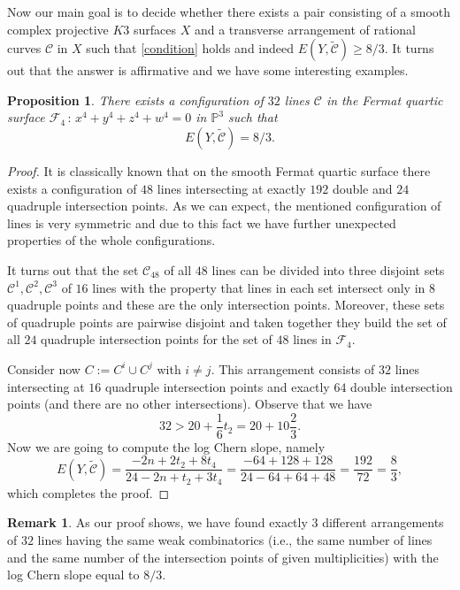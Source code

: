 \documentclass{article}
\theoremstyle{plain}
\newtheorem{proposition}[thm]{Proposition}
\theoremstyle{definition}
\newtheorem{remark}[thm]{Remark}
\numberwithin{equation}{section}
\begin{document}
Now our main goal is to decide whether there exists a pair consisting of a smooth complex projective $K3$ surfaces $X$ and a transverse arrangement of rational curves $\mathcal{C}$ in $X$ such that \eqref{condition} holds and indeed $E(Y, \widetilde{\mathcal{C}}) \geq 8/3$. It turns out that the answer is affirmative and we have some interesting examples.
\begin{proposition}
\label{maint}
There exists a configuration of $32$ lines $\mathcal{C}$ in the Fermat quartic surface $\mathcal{F}_{4} \, : \, x^4 + y^4 + z^4 + w^4 = 0$ in $\mathbb{P}^{3}$ such that
\[E(Y, \widetilde{\mathcal{C}}) = 8/3.\]
\end{proposition}
\begin{proof}
It is classically known that on the smooth Fermat quartic surface there exists a configuration of $48$ lines intersecting at exactly $192$ double and $24$ quadruple intersection points. As we can expect, the mentioned configuration of lines is very symmetric and due to this fact we have further unexpected properties of the whole configurations.

It turns out that the set $\mathcal{C}_{48}$ of all $48$ lines can be divided into three disjoint sets $\mathcal{C}^{1}, \mathcal{C}^{2}, \mathcal{C}^{3}$ of $16$ lines with the property that lines in each set intersect only in $8$ quadruple points and these are the only intersection points. Moreover, these sets of quadruple points are pairwise disjoint and taken together they build the set of all $24$ quadruple intersection points for the set of $48$ lines in $\mathcal{F}_{4}$.

Consider now $C:= C^{i} \cup C^{j}$ with $i\neq j$. This arrangement consists of $32$ lines intersecting at $16$ quadruple intersection points and exactly $64$ double intersection points (and there are no other intersections). Observe that we have
\[32 > 20 + \frac{1}{6}t_{2} = 20 + 10\frac{2}{3}.\]
Now we are going to compute the log Chern slope, namely
\[E(Y, \widetilde{\mathcal{C}})= \frac{-2n + 2t_{2} + 8t_{4}}{24 - 2n + t_{2} + 3t_{4}}= \frac{-64 + 128 + 128}{24-64 + 64+48} = \frac{192}{72}=\frac{8}{3},\]
which completes the proof.
\end{proof}
\begin{remark}
As our proof shows, we have found exactly $3$ different arrangements of $32$ lines having the same weak combinatorics (i.e., the same number of lines and the same number of the intersection points of given multiplicities) with the log Chern slope equal to $8/3$.
\end{remark}
\end{document}
